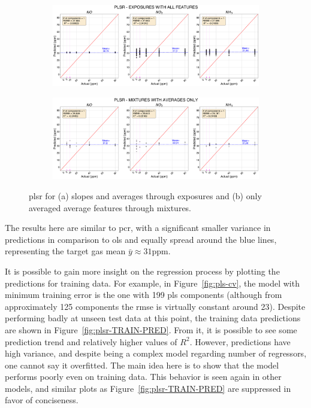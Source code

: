 \begin{figure}[!htb]
	\centering
	
	\begin{subfigure}[t]{1\textwidth}
		\includegraphics[width=1\linewidth]{../figures/plsr-act-vs-pred.png}
		\caption{}
		\label{fig:pls-act-vs-pred} 
	\end{subfigure}
	
	\begin{subfigure}[t]{1\textwidth}
		\includegraphics[width=1\linewidth]{../figures/plsr-act-vs-pred-avg-feat.png}
		\caption{}
		\label{fig:pls-act-vs-pred-avg-feat}
	\end{subfigure}
	
	\caption{\acrshort{plsr} for (a) slopes and averages through exposures and (b) only averaged average features through mixtures.}
	\label{fig:plsr-actual-vs-pred-both}
\end{figure}

The results here are similar to \acrshort{pcr}, with a significant smaller variance in predictions in comparison to \acrshort{ols} and equally spread around the blue lines, representing the target gas mean $\bar{y} \approx 31$ppm.

It is possible to gain more insight on the regression process by plotting the predictions for training data. For example, in Figure~\ref{fig:pls-cv}, the model with minimum training error is the one with 199 \acrshort{pls} components (although from approximately 125 components the \acrshort{rmse} is virtually constant around 23). Despite performing badly at unseen test data at this point, the training data predictions are shown in Figure~\ref{fig:plsr-TRAIN-PRED}. From it, it is possible to see some prediction trend and relatively higher values of $R^2$. However, predictions have high variance, and despite being a complex model regarding number of regressors, one cannot say it overfitted. The main idea here is to show that the model performs poorly even on training data. This behavior is seen again in other models, and similar plots as Figure~\ref{fig:plsr-TRAIN-PRED} are suppressed in favor of conciseness.

